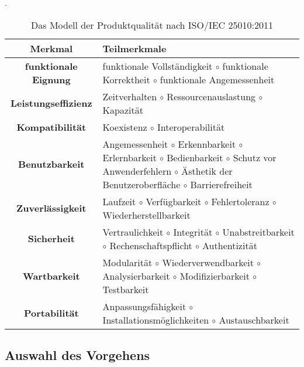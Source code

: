 \begin{table}[H]
    \centering
    \caption{Das Modell der Produktqualität nach ISO/IEC 25010:2011 \autocite[vgl.][S. 10]{ISO25010}}. 
    \label{table:SQuaRE}
    \begin{tabularx}{\columnwidth}{c|X}
    \textbf{Merkmal} & \textbf{Teilmerkmale} \\
    \hline
    \hline
    \textbf{funktionale Eignung} & 
        funktionale Vollständigkeit {$\circ$} funktionale Korrektheit {$\circ$} funktionale Angemessenheit 
    \\
    \hline
    \textbf{Leistungseffizienz}  & 
        Zeitverhalten {$\circ$} Ressourcenauslastung {$\circ$} Kapazität
    \\
    \hline
    \textbf{Kompatibilität}  & 
        Koexistenz {$\circ$} Interoperabilität
    \\
    \hline
    \textbf{Benutzbarkeit}  & 
        Angemessenheit {$\circ$} Erkennbarkeit {$\circ$} Erlernbarkeit {$\circ$} Bedienbarkeit {$\circ$} Schutz vor Anwenderfehlern {$\circ$} Ästhetik der Benutzeroberfläche {$\circ$} Barrierefreiheit
    \\
    \hline
    \textbf{Zuverlässigkeit}  & 
        Laufzeit {$\circ$} Verfügbarkeit {$\circ$} Fehlertoleranz {$\circ$} Wiederherstellbarkeit
    \\
    \hline
    \textbf{Sicherheit}  & 
        Vertraulichkeit {$\circ$} Integrität {$\circ$} Unabstreitbarkeit {$\circ$} Rechenschaftspflicht {$\circ$} Authentizität 
    \\
    \hline
    \textbf{Wartbarkeit}  & 
        Modularität {$\circ$} Wiederverwendbarkeit {$\circ$} Analysierbarkeit {$\circ$} Modifizierbarkeit {$\circ$} Testbarkeit
    \\
    \hline
    \textbf{Portabilität} & 
        Anpassungsfähigkeit {$\circ$} Installationsmöglichkeiten {$\circ$} \newline Austauschbarkeit
\end{tabularx}
\end{table}

\subsection{Auswahl des Vorgehens}
